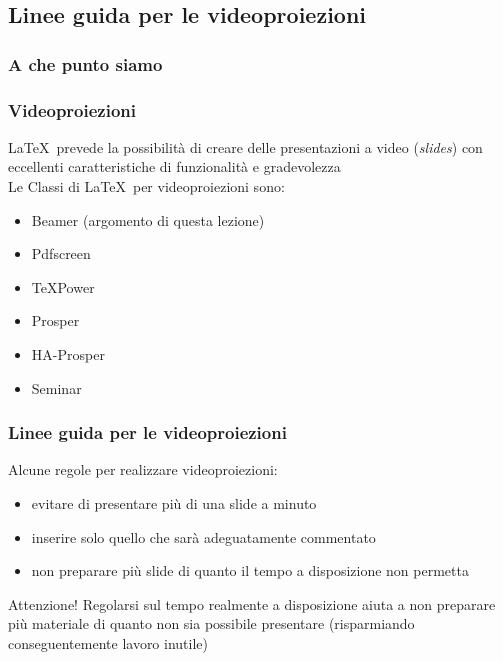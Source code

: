 \documentclass[svgnames,%
	ucs,%
	pdftex]{guitbeamer}
\begin{document}
\subsection[Linee guida]{Linee guida per le videoproiezioni}
\begin{frame}
  \frametitle{A che punto siamo}
\end{frame}
\begin{frame}
  \frametitle{Videoproiezioni}
	\LaTeX\ prevede la possibilit\`a di creare delle presentazioni a video (\textit{slides}) con eccellenti caratteristiche di funzionalit\`a e gradevolezza\\
  \bigskip
	Le Classi di \LaTeX\ per videoproiezioni sono:
	\begin{itemize}
		\item Beamer (argomento di questa lezione)
		\item Pdfscreen
		\item \TeX Power
		\item Prosper
		\item HA-Prosper
		\item Seminar
	\end{itemize}
\end{frame}
\begin{frame}
  \frametitle{Linee guida per le videoproiezioni}
	Alcune regole per realizzare videoproiezioni:\\
	\begin{itemize}
		\item evitare di presentare pi\`u di una slide a minuto
		\item inserire solo quello che sar\`a adeguatamente commentato
		\item non preparare pi\`u slide di quanto il tempo a disposizione non permetta
	\end{itemize}
	\begin{block}{Attenzione!}
	Regolarsi sul tempo realmente a disposizione aiuta a non preparare pi\`u materiale di quanto non sia possibile presentare (risparmiando conseguentemente lavoro inutile)
	\end{block}
\end{frame}
\end{document}
